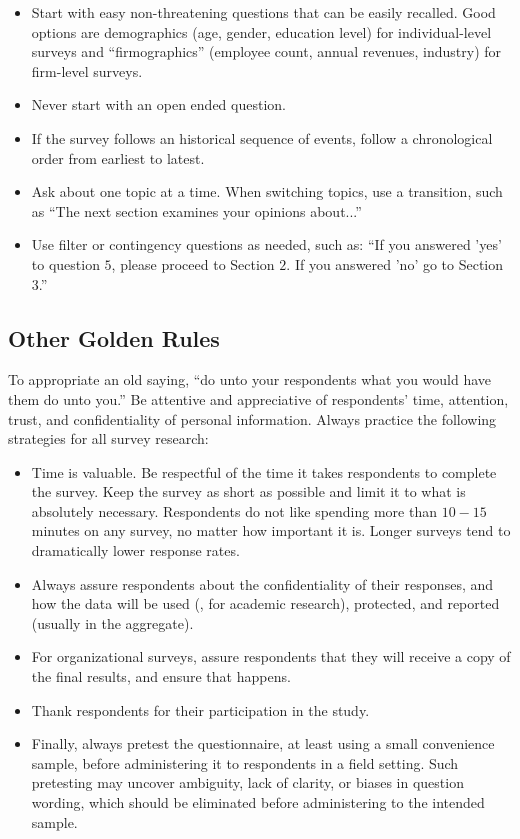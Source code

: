\begin{itemize}
	\item Start with easy non-threatening questions that can be easily recalled. Good options are	demographics (age, gender, education level) for individual-level surveys and ``firmographics'' (employee count, annual revenues, industry) for firm-level surveys.
	\item Never start with an open ended question.
	\item If the survey follows an historical sequence of events, follow a chronological order from earliest to latest.
	\item Ask about one topic at a time. When switching topics, use a transition, such as ``The next section examines your opinions about...''
	\item Use filter or contingency questions as needed, such as: ``If you answered 'yes' to question $ 5 $, please proceed to Section $ 2 $. If you answered 'no' go to Section $ 3 $.''
\end{itemize}

\subsection{Other Golden Rules}

To appropriate an old saying, ``do unto your respondents what you would have them do unto you.'' Be attentive and appreciative of respondents' time, attention, trust, and confidentiality of personal information. Always practice the following strategies for all survey research:

\begin{itemize}
	\item Time is valuable. Be respectful of the time it takes respondents to complete the survey. Keep the survey as short as possible and limit it to what is absolutely necessary. Respondents do not like spending more than $ 10-15 $ minutes on any survey, no matter how important it is. Longer surveys tend to dramatically lower response rates.
	\item Always assure respondents about the confidentiality of their responses, and how the data will be used (\eg, for academic research), protected, and reported (usually in the aggregate).
	\item For organizational surveys, assure respondents that they will receive a copy of the final results, and ensure that happens.
	\item Thank respondents for their participation in the study.
	\item Finally, always pretest the questionnaire, at least using a small convenience sample, before administering it to respondents in a field setting. Such pretesting may uncover ambiguity, lack of clarity, or biases in question wording, which should be eliminated before administering to the intended sample.
\end{itemize}

